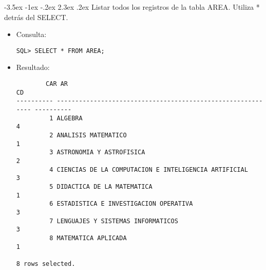 \documentclass[11pt]{report}
\makeatletter
\renewcommand\chapter{\@startsection{chapter}{0}{\z@}%
    {-3.5ex \@plus -1ex \@minus -.2ex}%
    {2.3ex \@plus.2ex}%
    {\normalfont\Large\bfseries}}
\makeatother
\begin{document}
\chapter{Listar todos los registros de la tabla AREA. Utiliza * detrás del SELECT.}
\begin{itemize}
  \item Consulta:
  \begin{verbatim}
SQL> SELECT * FROM AREA;
  \end{verbatim}
  \item{Resultado:}
  \begin{verbatim}
        CAR AR                                                                  CD                                                                                                                      
---------- ------------------------------------------------------------ ----------                                                                                                                      
         1 ALGEBRA                                                               4                                                                                                                      
         2 ANALISIS MATEMATICO                                                   1                                                                                                                      
         3 ASTRONOMIA Y ASTROFISICA                                              2                                                                                                                      
         4 CIENCIAS DE LA COMPUTACION E INTELIGENCIA ARTIFICIAL                  3                                                                                                                      
         5 DIDACTICA DE LA MATEMATICA                                            1                                                                                                                      
         6 ESTADISTICA E INVESTIGACION OPERATIVA                                 3                                                                                                                      
         7 LENGUAJES Y SISTEMAS INFORMATICOS                                     3                                                                                                                      
         8 MATEMATICA APLICADA                                                   1                                                                                                                      

8 rows selected.
  \end{verbatim}
\end{itemize}
\end{document}
